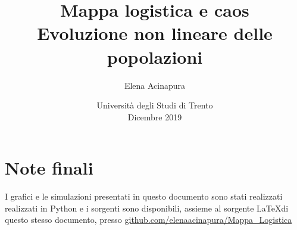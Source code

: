 \documentclass{article}
\title{\textbf{\LARGE Mappa logistica e caos}\\ {\Large Evoluzione non lineare delle popolazioni}}
\author{Elena Acinapura}
\date{{Università degli Studi di Trento} \\{Dicembre 2019}}
\theoremstyle{teorema}
\theoremstyle{definizione}
\begin{document}
\maketitle
\begin{minipage}{\linewidth}
\end{minipage}

\newpage
\tableofcontents
\newpage






\vspace{30pt}

\vspace{30pt}
\section*{Note finali}
I grafici e le simulazioni presentati in questo documento sono stati realizzati realizzati in Python e i sorgenti sono disponibili, assieme al sorgente \LaTeX di questo stesso documento, presso \url{github.com/elenaacinapura/Mappa_Logistica}
\end{document}
